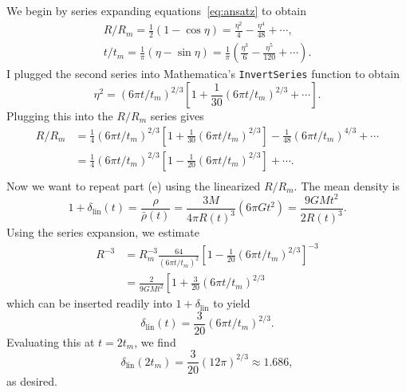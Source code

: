 \documentclass{article}
\begin{document}
We begin by series expanding equations~\ref{eq:ansatz} to obtain
\begin{gather}
	R/R_m
	= \frac{1}{2}(1 - \cos\eta)
	= \frac{\eta^2}{4} - \frac{\eta^4}{48} + \cdots, \\
	t/t_m
	= \frac{1}{\pi} (\eta - \sin\eta)
	= \frac{1}{\pi} \left(
		\frac{\eta^3}{6} - \frac{\eta^5}{120} + \cdots
	\right).
\end{gather}
I plugged the second series into Mathematica's \texttt{InvertSeries} function
to obtain
\begin{equation}
	\eta^2 = (6\pi t/t_m)^{2/3} \left[
		1 + \frac{1}{30} (6\pi t/t_m)^{2/3} + \cdots
	\right].
\end{equation}
Plugging this into the $R/R_m$ series gives
\begin{equation}
\begin{aligned}
	R/R_m
	&= \frac{1}{4} (6\pi t/t_m)^{2/3} \left[
		1 + \frac{1}{30} (6\pi t/t_m)^{2/3}
	\right] - \frac{1}{48} (6\pi t/t_m)^{4/3} + \cdots \\
	&= \frac{1}{4} (6\pi t/t_m)^{2/3} \left[
		1 - \frac{1}{20} (6\pi t/t_m)^{2/3}
	\right] + \cdots. \\
\end{aligned}
\end{equation}
Now we want to repeat part (e) using the linearized $R/R_m$. The mean density is
\begin{equation}
	1 + \delta_\text{lin}(t)
	= \frac{\rho}{\bar\rho(t)}
	= \frac{3M}{4\pi R(t)^3} (6\pi G t^2)
	= \frac{9 G M t^2}{2 R(t)^3}.
\end{equation}
Using the series expansion, we estimate
\begin{equation}
\begin{aligned}
	R^{-3}
	&= R_m^{-3} \frac{64}{(6 \pi t/t_m)^2} \left[
		1 - \frac{1}{20} (6\pi t/t_m)^{2/3}
	\right]^{-3} \\
	&= \frac{2}{9 G M t^2} \left[
		1 + \frac{3}{20} (6\pi t/t_m)^{2/3}
	\right.
\end{aligned}
\end{equation}
which can be inserted readily into $1 + \delta_\text{lin}$ to yield
\begin{equation}
	\delta_\text{lin}(t) = \frac{3}{20} (6\pi t/t_m)^{2/3}.
\end{equation}
Evaluating this at $t = 2 t_m$, we find
\begin{equation}
	\delta_\text{lin}(2 t_m) = \frac{3}{20} (12\pi)^{2/3} \approx 1.686,
\end{equation}
as desired.
\end{document}
